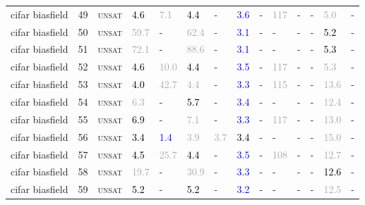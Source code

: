 \begin{center}
{\begin{longtable}{@{}llllllllllllll@{}}
cifar biasfield & 49 & \textsc{unsat} & \textcolor{black}{4.6} & \textcolor{darkgray}{7.1} & \textcolor{black}{4.4} & - & \textcolor{blue}{3.6} & - & \textcolor{darkgray}{117} & - & - & \textcolor{darkgray}{5.0} & - \\
cifar biasfield & 50 & \textsc{unsat} & \textcolor{darkgray}{59.7} & - & \textcolor{darkgray}{62.4} & - & \textcolor{blue}{3.1} & - & - & - & - & \textcolor{black}{5.2} & - \\
cifar biasfield & 51 & \textsc{unsat} & \textcolor{darkgray}{72.1} & - & \textcolor{darkgray}{88.6} & - & \textcolor{blue}{3.1} & - & - & - & - & \textcolor{black}{5.3} & - \\
cifar biasfield & 52 & \textsc{unsat} & \textcolor{black}{4.6} & \textcolor{darkgray}{10.0} & \textcolor{black}{4.4} & - & \textcolor{blue}{3.5} & - & \textcolor{darkgray}{117} & - & - & \textcolor{darkgray}{5.3} & - \\
cifar biasfield & 53 & \textsc{unsat} & \textcolor{black}{4.0} & \textcolor{darkgray}{42.7} & \textcolor{darkgray}{4.4} & - & \textcolor{blue}{3.3} & - & \textcolor{darkgray}{115} & - & - & \textcolor{darkgray}{13.6} & - \\
cifar biasfield & 54 & \textsc{unsat} & \textcolor{darkgray}{6.3} & - & \textcolor{black}{5.7} & - & \textcolor{blue}{3.4} & - & - & - & - & \textcolor{darkgray}{12.4} & - \\
cifar biasfield & 55 & \textsc{unsat} & \textcolor{black}{6.9} & - & \textcolor{darkgray}{7.1} & - & \textcolor{blue}{3.3} & - & \textcolor{darkgray}{117} & - & - & \textcolor{darkgray}{13.0} & - \\
cifar biasfield & 56 & \textsc{unsat} & \textcolor{black}{3.4} & \textcolor{blue}{1.4} & \textcolor{darkgray}{3.9} & \textcolor{darkgray}{3.7} & \textcolor{black}{3.4} & - & - & - & - & \textcolor{darkgray}{15.0} & - \\
cifar biasfield & 57 & \textsc{unsat} & \textcolor{black}{4.5} & \textcolor{darkgray}{25.7} & \textcolor{black}{4.4} & - & \textcolor{blue}{3.5} & - & \textcolor{darkgray}{108} & - & - & \textcolor{darkgray}{12.7} & - \\
cifar biasfield & 58 & \textsc{unsat} & \textcolor{darkgray}{19.7} & - & \textcolor{darkgray}{30.9} & - & \textcolor{blue}{3.3} & - & - & - & - & \textcolor{black}{12.6} & - \\
cifar biasfield & 59 & \textsc{unsat} & \textcolor{black}{5.2} & - & \textcolor{black}{5.2} & - & \textcolor{blue}{3.2} & - & - & - & - & \textcolor{darkgray}{12.5} & - \\

\end{longtable}}
\end{center}
